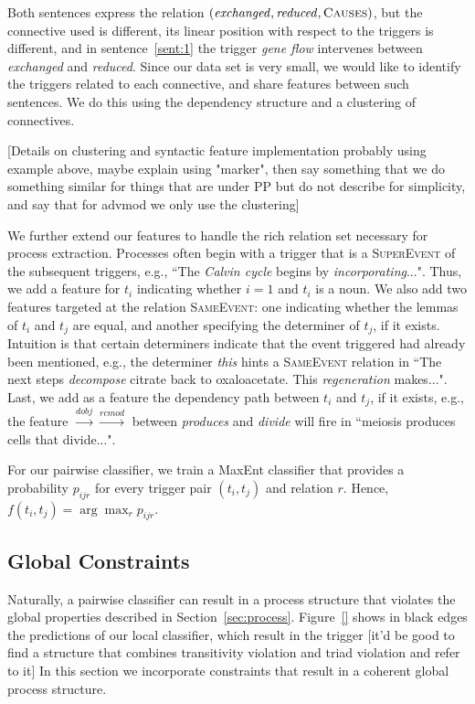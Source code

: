 Both sentences express the relation $(\mbox{\emph{exchanged}},\mbox{\emph{reduced}},\mbox{\textsc{Causes}})$, but the connective used is different, its linear position with respect to the triggers is different, and in sentence~\ref{sent:1} the trigger \emph{gene flow} intervenes between \emph{exchanged} and \emph{reduced}. Since our data set is very small, we would like to identify the triggers related to each connective, and share features between such sentences. We do this using the dependency structure and a clustering of connectives.

[Details on clustering and syntactic feature implementation probably using example above, maybe explain using "marker", then say something that we do something similar for things that are under PP but do not describe for simplicity, and say that for advmod we only use the clustering]

We further extend our features to handle the rich relation set necessary for process extraction. Processes often begin with a trigger that is a \textsc{SuperEvent} of the subsequent triggers, e.g., ``The \emph{Calvin cycle} begins by \emph{incorporating}...". Thus, we add a feature for $t_i$ indicating whether $i=1$ and $t_i$  is a noun. We also add two features targeted at the relation \textsc{SameEvent}: one indicating whether the lemmas of $t_i$ and $t_j$ are equal, and another specifying the determiner of $t_j$, if it exists. Intuition is that certain determiners indicate that the event triggered had already been mentioned, e.g., the determiner \emph{this} hints a \textsc{SameEvent} relation in ``The next steps \emph{decompose} citrate back to oxaloacetate. This \emph{regeneration} makes...". Last, we add as a feature the dependency path between $t_i$ and $t_j$, if it exists, e.g., the feature $\xrightarrow{\scriptscriptstyle dobj} \xrightarrow{\scriptscriptstyle rcmod}$ between \emph{produces} and \emph{divide} will fire in ``meiosis produces cells that divide...".

For our pairwise classifier, we train a MaxEnt classifier that provides a probability $p_{ijr}$ for every trigger pair $(t_i,t_j)$ and relation $r$. Hence, $f(t_i,t_j)= \arg\max_r p_{ijr}$.

\subsection{Global Constraints} \label{subsec:global}

Naturally, a pairwise classifier can result in a process structure that violates the global properties described in Section~\ref{sec:process}. Figure~\ref{} shows in black edges the predictions of our local classifier, which result in the trigger [it'd be good to find a structure that combines transitivity violation and triad violation and refer to it] In this section we incorporate constraints that result in a coherent global process structure.

